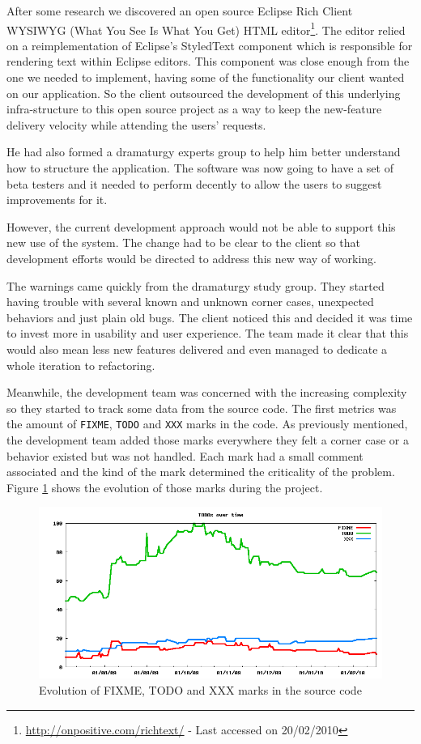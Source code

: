 \documentclass[lnbip]{svmultln}
\begin{document}
After some research we discovered an open source Eclipse Rich Client WYSIWYG (What You See Is What You Get) HTML editor\footnote{\url{http://onpositive.com/richtext/} - Last accessed on 20/02/2010}. The editor relied on a reimplementation of Eclipse's StyledText component which is responsible for rendering text within Eclipse editors. This component was close enough from the one we needed to implement, having some of the functionality our client wanted on our application. So the client outsourced the development of this underlying infra-structure to this open source project as a way to keep the new-feature delivery velocity while attending the users' requests.



He had also formed a dramaturgy experts group to help him better understand how to structure the application. The software was now going to have a set of beta testers and it needed to perform decently to allow the users to suggest improvements for it.

However, the current development approach would not be able to support this new use of the system. The change had to be clear to the client so that development efforts would be directed to address this new way of working.

The warnings came quickly from the dramaturgy study group. They started having trouble with several known and unknown corner cases, unexpected behaviors and just plain old bugs. The client noticed this and decided it was time to invest more in usability and user experience. The team made it clear that this would also mean less new features delivered and even managed to dedicate a whole iteration to refactoring.


Meanwhile, the development team was concerned with the increasing complexity so they started to track some data from the source code. The first metrics was the amount of \texttt{FIXME}, \texttt{TODO} and \texttt{XXX} marks in the code. As previously mentioned, the development team added those marks everywhere they felt a corner case or a behavior existed but was not handled. Each mark had a small comment associated and the kind of the mark determined the criticality of the problem. Figure \ref{fig:TODOs} shows the evolution of those marks during the project.

\begin{figure}[hbt]
  \centerline{
    \includegraphics[width=120mm]{TODOs.png}
  }
  \caption{Evolution of FIXME, TODO and XXX marks in the source code}
  \label{fig:TODOs}
\end{figure}
\end{document}
